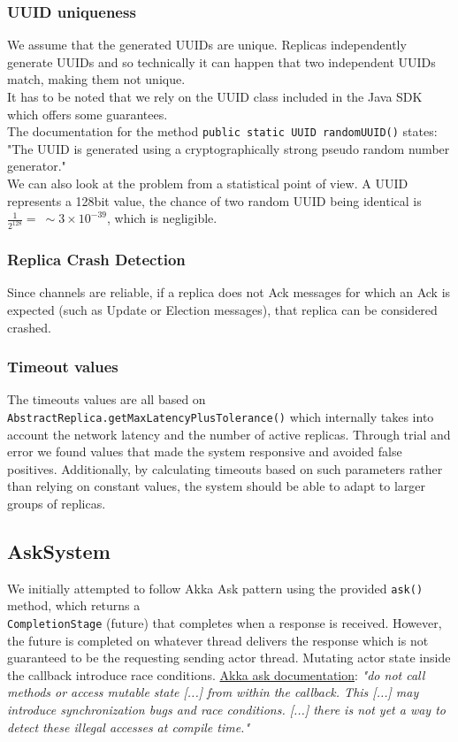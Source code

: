 \documentclass[a4paper]{article}
\begin{document}
            \subsubsection{UUID uniqueness}
                We assume that the generated UUIDs are unique. Replicas independently generate UUIDs and so technically it can happen that two independent UUIDs match, making them not unique.\\
                It has to be noted that we rely on the UUID class included in the Java SDK which offers some guarantees.\\
                The documentation for the method \texttt{public static UUID randomUUID()} states: "The UUID is generated using a cryptographically strong pseudo random number generator."\\
                We can also look at the problem from a statistical point of view. A UUID represents a 128bit value, the chance of two random UUID being identical is \( \frac{1}{2^{128}} = ~\sim3 \times 10^{-39} \), which is negligible.
            \subsubsection{Replica Crash Detection}
                Since channels are reliable, if a replica does not Ack messages for which an Ack is expected (such as Update or Election messages), that replica can be considered crashed.
            \subsubsection{Timeout values}
                The timeouts values are all based on \texttt{AbstractReplica.getMaxLatencyPlusTolerance()} which internally takes into account the network latency and the number of active replicas.
                Through trial and error we found values that made the system responsive and avoided false positives.
                Additionally, by calculating timeouts based on such parameters rather than relying on constant values, the system should be able to adapt to larger groups of replicas.
        \subsection{AskSystem}
            We initially attempted to follow Akka Ask pattern using the provided \texttt{ask()} method, which returns a\\
            \texttt{CompletionStage} (future) that completes when a response is received. However, the future is completed on whatever thread delivers the response which is not guaranteed to be the requesting sending actor thread.
            Mutating actor state inside the callback introduce race conditions. \href{https://doc.akka.io/japi/akka-core/2.10/akka/pattern/Patterns.html#ask(akka.actor.ActorRef,java.lang.Object,akka.util.Timeout)}{Akka ask documentation}:
            \textit{"do not call methods or access mutable state [...] from within the callback. This [...] may introduce synchronization bugs and race conditions. [...] there is not yet a way to detect these illegal accesses at compile time."}
\end{document}
